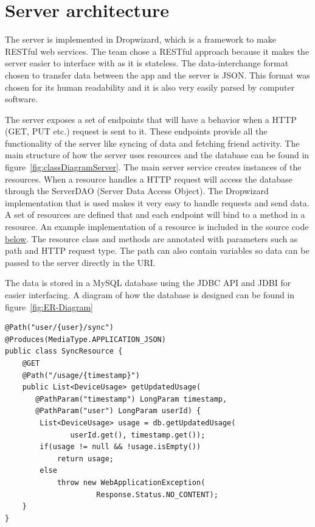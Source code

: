 \section{Server architecture}
The server is implemented in Dropwizard, which is a framework to make RESTful web services. The team chose a RESTful approach because it makes the server easier to interface with as it is stateless. The data-interchange format chosen to transfer data between the app and the server is JSON. This format was chosen for its human readability and it is also very easily parsed by computer software.

The server exposes a set of endpoints that will have a behavior when a HTTP (GET, PUT etc.) request is sent to it. These endpoints provide all the functionality of the server like syncing of data and fetching friend activity. The main structure of how the server uses resources and the database can be found in figure~\ref{fig:classDiagramServer}. The main server service creates instances of the resources. When a resource handles a HTTP request will access the database through the ServerDAO (Server Data Access Object). The Dropwizard implementation that is used makes it very easy to handle requests and send data. A set of resources are defined that and each endpoint will bind to a method in a resource. An example implementation of a resource is included in the source code \hyperref[lst:dropwizardResource]{below}. The resource class and methods are annotated with parameters such as path and HTTP request type. The path can also contain variables so data can be passed to the server directly in the URI. 

The data is stored in a MySQL database using the JDBC API and JDBI for easier interfacing. A diagram of how the database is designed can be found in figure~\ref{fig:ER-Diagram}


\begin{lstlisting}[caption={Dropwizard resource example}, label={lst:dropwizardResource}]
@Path("user/{user}/sync")
@Produces(MediaType.APPLICATION_JSON)
public class SyncResource {
    @GET
    @Path("/usage/{timestamp}")
    public List<DeviceUsage> getUpdatedUsage(
	   @PathParam("timestamp") LongParam timestamp, 
	   @PathParam("user") LongParam userId) {
        List<DeviceUsage> usage = db.getUpdatedUsage(
		       userId.get(), timestamp.get());
        if(usage != null && !usage.isEmpty())
            return usage;
        else
            throw new WebApplicationException(
			         Response.Status.NO_CONTENT);
    }
}
\end{lstlisting}

